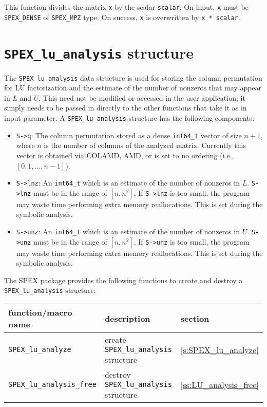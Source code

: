 \documentclass[12pt]{report}
\theoremstyle{definition}
\begin{document}
This function divides the matrix \verb|x| by the scalar \verb|scalar|. On input, \verb|x| must be \verb|SPEX_DENSE| of \verb|SPEX_MPZ| type. On success, \verb|x| is overwritten by \verb|x * scalar|.


\cprotect\section{\verb|SPEX_lu_analysis| structure}
\label{ss:SPEX_lu_analysis}

The \verb|SPEX_lu_analysis| data structure is used for storing the column
permutation for LU factorization and the estimate of the number of nonzeros
that may appear in $L$ and $U$.  This need not be modified or accessed in the
user application; it simply needs to be passed in directly to the other
functions that take it as in input parameter. A \verb|SPEX_lu_analysis|
structure has the following components:

\begin{itemize}
\item \verb|S->q|: The column permutation stored as a dense \verb|int64_t|
vector of size $n+1$, where $n$ is the number of columns of the analyzed matrix.
Currently this vector is obtained via COLAMD, AMD, or is set to no ordering
(i.e., $[0, 1, \hdots, n-1]$).

\item \verb|S->lnz|: An \verb|int64_t| which is an estimate of the number of
nonzeros in $L$. \verb|S->lnz| must be in the range of $[n, n^2]$. If
\verb|S->lnz| is too small, the program may waste time performing extra memory
reallocations. This is set during the symbolic analysis.

\item \verb|S->unz|: An \verb|int64_t| which is an estimate of the number of
nonzeros in $U$. \verb|S->unz| must be in the range of $[n, n^2]$. If
\verb|S->unz| is too small, the program may waste time performing extra memory
reallocations. This is set during the symbolic analysis.
\end{itemize}

The SPEX package provides the following functions to create and destroy a
\verb|SPEX_lu_analysis| structure:

{\small
\begin{center}
\begin{tabular}{lll}
\hline
function/macro name & description & section \\
\hline
\verb|SPEX_lu_analyze|
    & create \verb|SPEX_lu_analysis| structure
    & \ref{s:SPEX_lu_analyze} \\
\hline
\verb|SPEX_lu_analysis_free|
    & destroy \verb|SPEX_lu_analysis| structure
    & \ref{ss:LU_analysis_free} \\
\hline
\end{tabular}
\end{center}
}
\end{document}
